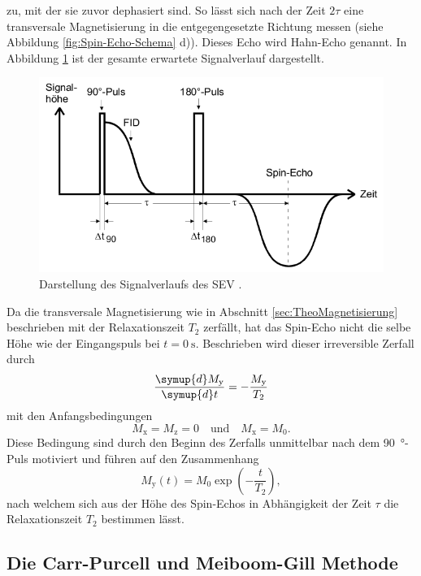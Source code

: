 zu, mit der sie zuvor dephasiert sind.
So lässt sich nach der Zeit $2 \tau$ eine transversale Magnetisierung in die
entgegengesetzte Richtung messen (siehe Abbildung \ref{fig:Spin-Echo-Schema} d)).
Dieses Echo wird Hahn-Echo genannt.
In Abbildung \ref{fig:Hahn-Echo} ist der gesamte erwartete Signalverlauf dargestellt.
\begin{figure}
  \centering
  \includegraphics[width=.7\textwidth]{images/hahn-echo.pdf}
  \caption{Darstellung des Signalverlaufs des SEV \cite[9]{anleitung}.}
  \label{fig:Hahn-Echo}
\end{figure}
Da die transversale Magnetisierung wie in Abschnitt \ref{sec:TheoMagnetisierung}
beschrieben mit der Relaxationszeit $T_2$ zerfällt, hat das Spin-Echo nicht die
selbe Höhe wie der Eingangspuls bei $t = \SI{0}{\second}$.
Beschrieben wird dieser irreversible Zerfall durch
\begin{equation*}
  \frac{\symup{d} M_\text{y}}{\symup{d} t} = - \frac{M_\text{y}}{T_2}
\end{equation*}
mit den Anfangsbedingungen
\begin{equation*}
  M_\text{x} = M_\text{z} = 0 \quad \text{und} \quad M_\text{x} = M_0.
\end{equation*}
Diese Bedingung sind durch den Beginn des Zerfalls unmittelbar nach dem
\SI{90}{\degree}-Puls motiviert und führen auf den Zusammenhang
\begin{equation}
  M_\text{y}\!\left(t\right) = M_0 \exp\!\left(- \frac{t}{T_2}\right),
  \label{eqn:Spin-Echo-Statisch}
\end{equation}
nach welchem sich aus der Höhe des Spin-Echos in Abhängigkeit der
Zeit $\tau$ die Relaxationszeit $T_2$ bestimmen lässt.


\subsection{Die Carr-Purcell und Meiboom-Gill Methode}
\label{sec:CP-und-MG}

